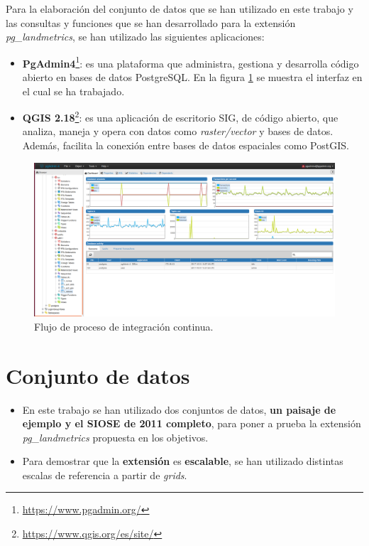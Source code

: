 Para la elaboración del conjunto de datos que se han utilizado en este trabajo y las consultas y funciones que se han desarrollado para la extensión \textit{pg\_landmetrics}, se han utilizado las siguientes aplicaciones:

\begin{itemize}
\item\textbf{PgAdmin4}\footnote{\url{https://www.pgadmin.org/}}: es una plataforma que administra, gestiona y desarrolla código abierto en bases de datos PostgreSQL. En la figura \ref{fig:carga} se muestra el interfaz en el cual se ha trabajado.
\item\textbf{QGIS 2.18}\footnote{\url{https://www.qgis.org/es/site/}}: es una aplicación de escritorio SIG, de código abierto, que analiza, maneja y opera con datos como \textit{raster/vector} y bases de datos. Además, facilita la conexión entre bases de datos espaciales como PostGIS.
\end{itemize}

\begin{figure}
\begin{center}
\includegraphics[width=\textwidth]{Metodologia/Figs/carga-siose-2011.png}
\caption{Flujo de proceso de integración continua. \label{fig:carga}}
\end{center}
\end{figure}


\section{Conjunto de datos}

\begin{graybox}
\begin{itemize}
\item En este trabajo se han utilizado dos conjuntos de datos, \textbf{un paisaje de ejemplo y el SIOSE de 2011 completo}, para poner a prueba la extensión \textit{pg\_landmetrics} propuesta en los objetivos.
\item Para demostrar que la \textbf{extensión} es \textbf{escalable}, se han utilizado distintas escalas de referencia a partir de \textit{grids}.
\end{itemize}
\end{graybox}

